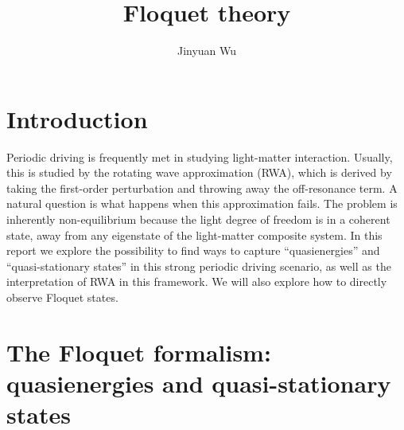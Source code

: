 \documentclass[hyperref, a4paper]{article}
\title{Floquet theory}
\author{Jinyuan Wu}
\begin{document}
\maketitle

\section{Introduction} 

Periodic driving is frequently met in studying light-matter interaction.
Usually, this is studied by the rotating wave approximation (RWA), 
which is derived by taking the first-order perturbation 
and throwing away the off-resonance term.
A natural question is what happens when this approximation fails.
The problem is inherently non-equilibrium because the light degree of freedom 
is in a coherent state, away from any eigenstate of the light-matter composite system.
In this report we explore the possibility to find ways to 
capture ``quasienergies'' and ``quasi-stationary states''
in this strong periodic driving scenario, 
as well as the interpretation of RWA in this framework.
We will also explore how to directly observe Floquet states.

\section{The Floquet formalism: quasienergies and quasi-stationary states}
\end{document}
